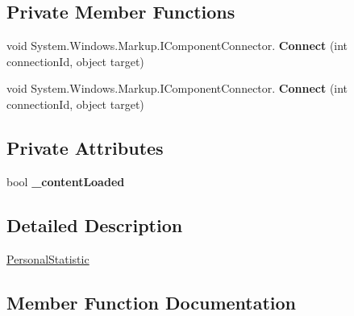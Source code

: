 \subsection*{Private Member Functions}
\begin{DoxyCompactItemize}
\item 
\mbox{\label{class_t_h_b___plugin___social_1_1_personal_statistic_1_1_personal_statistic_a2caa604388601555e72bad0ce97f0c03}} 
void System.\+Windows.\+Markup.\+I\+Component\+Connector. {\bfseries Connect} (int connection\+Id, object target)
\item 
\mbox{\label{class_t_h_b___plugin___social_1_1_personal_statistic_1_1_personal_statistic_a2caa604388601555e72bad0ce97f0c03}} 
void System.\+Windows.\+Markup.\+I\+Component\+Connector. {\bfseries Connect} (int connection\+Id, object target)
\end{DoxyCompactItemize}
\subsection*{Private Attributes}
\begin{DoxyCompactItemize}
\item 
\mbox{\label{class_t_h_b___plugin___social_1_1_personal_statistic_1_1_personal_statistic_a037d8487091d3848a7e6f0e96170ca0c}} 
bool {\bfseries \+\_\+content\+Loaded}
\end{DoxyCompactItemize}


\subsection{Detailed Description}
\mbox{\hyperlink{class_t_h_b___plugin___social_1_1_personal_statistic_1_1_personal_statistic}{Personal\+Statistic}} 



\subsection{Member Function Documentation}
\mbox{\label{class_t_h_b___plugin___social_1_1_personal_statistic_1_1_personal_statistic_accd1054e342a7f08b35fea1e39378bf3}} 
